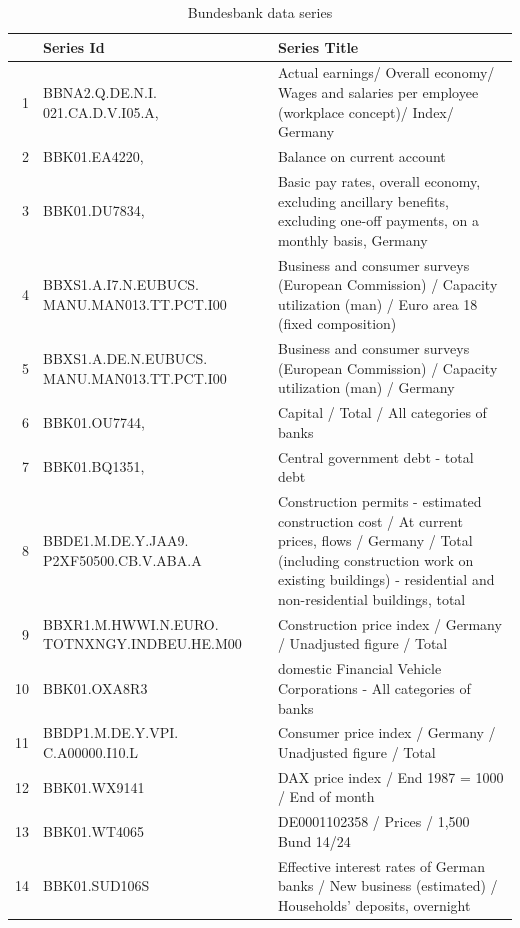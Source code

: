 \documentclass[11pt]{article}
\begin{document}
\begin{table}[ht]
\label{Bundesbank data series}
\caption{Bundesbank data series}
\centering
\begin{tabular}{rp{5cm}p{11cm}}
& \textbf{Series Id} & \textbf{Series Title} \\
  \hline
  \hline
1 & BBNA2.Q.DE.N.I. 021.CA.D.V.I05.A, & Actual earnings/ Overall economy/ Wages and salaries per employee (workplace concept)/ Index/ Germany \\ 
  \hline
  2 & BBK01.EA4220, & Balance on current account \\ 
  \hline
  3 & BBK01.DU7834, & Basic pay rates, overall economy, excluding ancillary benefits, excluding one-off payments, on a monthly basis, Germany \\ 
  \hline
  4 & BBXS1.A.I7.N.EUBUCS. MANU.MAN013.TT.PCT.I00 & Business and consumer surveys (European Commission) / Capacity utilization (man) / Euro area 18 (fixed composition) \\ 
  \hline
  5 & BBXS1.A.DE.N.EUBUCS. MANU.MAN013.TT.PCT.I00 & Business and consumer surveys (European Commission) / Capacity utilization (man) / Germany \\ 
  \hline
  6 & BBK01.OU7744, & Capital / Total / All categories of banks \\ 
  \hline
  7 & BBK01.BQ1351, & Central government debt - total debt \\ 
  \hline
  8 & BBDE1.M.DE.Y.JAA9. P2XF50500.CB.V.ABA.A & Construction permits - estimated construction cost / At current prices, flows / Germany / Total (including construction work on existing buildings) - residential and non-residential buildings, total \\ 
  \hline
  9 & BBXR1.M.HWWI.N.EURO. TOTNXNGY.INDBEU.HE.M00 & Construction price index / Germany / Unadjusted figure / Total \\ 
  \hline
  10 & BBK01.OXA8R3 & domestic Financial Vehicle Corporations - All categories of banks \\ 
  \hline
  11 & BBDP1.M.DE.Y.VPI. C.A00000.I10.L & Consumer price index / Germany / Unadjusted figure / Total \\ 
  \hline
  12 & BBK01.WX9141 & DAX price index / End 1987 = 1000 / End of month \\ 
  \hline
  13 & BBK01.WT4065 & DE0001102358 / Prices / 1,500 Bund 14/24 \\ 
  \hline
  14 & BBK01.SUD106S & Effective interest rates of German banks / New business (estimated) / Households' deposits, overnight \\ 

\end{tabular}
\end{table}
\end{document}
